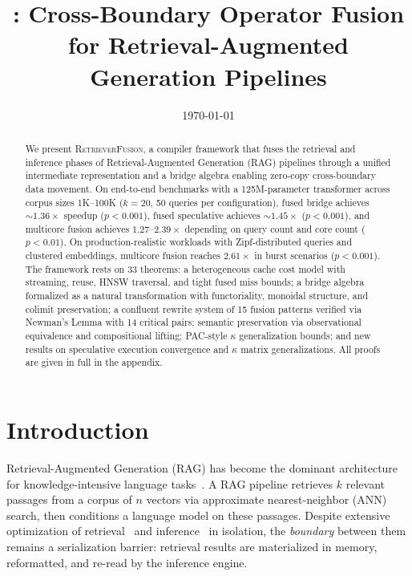\documentclass{article}
\title{\RetrieverFusion{}: Cross-Boundary Operator Fusion\\for Retrieval-Augmented Generation Pipelines}
\date{\today}
\theoremstyle{definition}
\theoremstyle{remark}
\newcommand{\RetrieverFusion}{\textsc{RetrieverFusion}}
\begin{document}
\maketitle

\begin{abstract}
We present \RetrieverFusion{}, a compiler framework that fuses the retrieval and inference phases of Retrieval-Augmented Generation (RAG) pipelines through a unified intermediate representation and a bridge algebra enabling zero-copy cross-boundary data movement.
On end-to-end benchmarks with a 125M-parameter transformer across corpus sizes 1K--100K ($k{=}20$, 50 queries per configuration), fused bridge achieves ${\sim}1.36\times$ speedup ($p < 0.001$), fused speculative achieves ${\sim}1.45\times$ ($p < 0.001$), and multicore fusion achieves $1.27$--$2.39\times$ depending on query count and core count ($p < 0.01$).
On production-realistic workloads with Zipf-distributed queries and clustered embeddings, multicore fusion reaches $2.61\times$ in burst scenarios ($p < 0.001$).
The framework rests on 33 theorems: a heterogeneous cache cost model with streaming, reuse, HNSW traversal, and tight fused miss bounds; a bridge algebra formalized as a natural transformation with functoriality, monoidal structure, and colimit preservation; a confluent rewrite system of 15 fusion patterns verified via Newman's Lemma with 14 critical pairs; semantic preservation via observational equivalence and compositional lifting; PAC-style $\kappa$ generalization bounds; and new results on speculative execution convergence and $\kappa$ matrix generalizations.
All proofs are given in full in the appendix.
\end{abstract}

\section{Introduction}\label{sec:intro}

Retrieval-Augmented Generation (RAG) has become the dominant architecture for knowledge-intensive language tasks~\cite{lewis2020rag,borgeaud2022retro,guu2020realm}.
A RAG pipeline retrieves $k$ relevant passages from a corpus of $n$ vectors via approximate nearest-neighbor (ANN) search, then conditions a language model on these passages.
Despite extensive optimization of retrieval~\cite{malkov2020hnsw,johnson2021faiss} and inference~\cite{dao2022flashattention,kwon2023vllm} in isolation, the \emph{boundary} between them remains a serialization barrier: retrieval results are materialized in memory, reformatted, and re-read by the inference engine.
\end{document}
